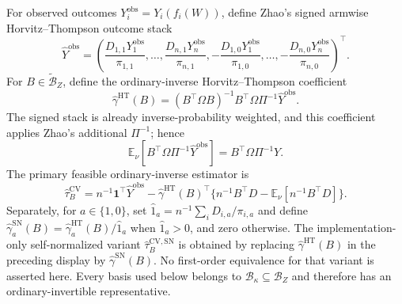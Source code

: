 For observed outcomes \(Y_i^{\mathrm{obs}}=Y_i(f_i(W))\), define Zhao's signed armwise Horvitz--Thompson outcome stack
\[
\widehat Y^{\mathrm{obs}}=
\left(\frac{D_{1,1}Y_1^{\mathrm{obs}}}{\pi_{1,1}},\ldots,
\frac{D_{n,1}Y_n^{\mathrm{obs}}}{\pi_{n,1}},
-\frac{D_{1,0}Y_1^{\mathrm{obs}}}{\pi_{1,0}},\ldots,
-\frac{D_{n,0}Y_n^{\mathrm{obs}}}{\pi_{n,0}}\right)^{\top}.
\]
For \(B\in\widetilde{\mathcal B}_Z\), define the ordinary-inverse Horvitz--Thompson coefficient
\[
\widehat\gamma^{\mathrm{HT}}(B)
=(B^{\top}\Omega B)^{-1}B^{\top}\Omega\Pi^{-1}\widehat Y^{\mathrm{obs}}.
\]
The signed stack is already inverse-probability weighted, and this coefficient applies Zhao's additional \(\Pi^{-1}\); hence
\[
\mathbb E_\nu[B^{\top}\Omega\Pi^{-1}\widehat Y^{\mathrm{obs}}]
=B^{\top}\Omega\Pi^{-1}Y.
\]
The primary feasible ordinary-inverse estimator is
\[
\widehat\tau_B^{\mathrm{CV}}
=n^{-1}\mathbf1^{\top}\widehat Y^{\mathrm{obs}}
-\widehat\gamma^{\mathrm{HT}}(B)^{\top}
\{n^{-1}B^{\top}D-\mathbb E_\nu[n^{-1}B^{\top}D]\}.
\]
Separately, for \(a\in\{1,0\}\), set \(\widehat1_a=n^{-1}\sum_iD_{i,a}/\pi_{i,a}\) and define \(\widehat\gamma_a^{\mathrm{SN}}(B)=\widehat\gamma_a^{\mathrm{HT}}(B)/\widehat1_a\) when \(\widehat1_a>0\), and zero otherwise.  The implementation-only self-normalized variant \(\widehat\tau_B^{\mathrm{CV,SN}}\) is obtained by replacing \(\widehat\gamma^{\mathrm{HT}}(B)\) in the preceding display by \(\widehat\gamma^{\mathrm{SN}}(B)\).  No first-order equivalence for that variant is asserted here.  Every basis used below belongs to \(\mathcal B_\kappa\subseteq\mathcal B_Z\) and therefore has an ordinary-invertible representative.